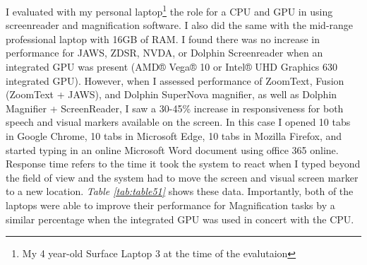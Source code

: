 I evaluated with my personal laptop\footnote{\raggedright My 4 year-old Surface Laptop 3 at the time of the evalutaion} the role for a CPU and GPU in using screenreader and magnification software. I also did the same with the mid-range professional laptop with 16GB of RAM. I found there was no increase in performance for JAWS, ZDSR, NVDA, or Dolphin Screenreader when an integrated GPU was present (AMD® Vega® 10 or Intel® UHD Graphics 630 integrated GPU). However, when I assessed performance of ZoomText, Fusion (ZoomText + JAWS), and Dolphin SuperNova magnifier, as well as Dolphin Magnifier + ScreenReader, I saw a 30-45\% increase in responsiveness for both speech and visual markers available on the screen. In this case I opened 10 tabs in Google Chrome, 10 tabs in Microsoft Edge, 10 tabs in Mozilla Firefox, and started typing in an online Microsoft Word document using office 365 online. Response time refers to the time it took the system to react when I typed beyond the field of view and the system had to move the screen and visual screen marker to a new location. \textit{Table \ref{tab:table51}} shows these data. Importantly, both of the laptops were able to improve their performance for Magnification tasks by a similar percentage when the integrated GPU was used in concert with the CPU.

